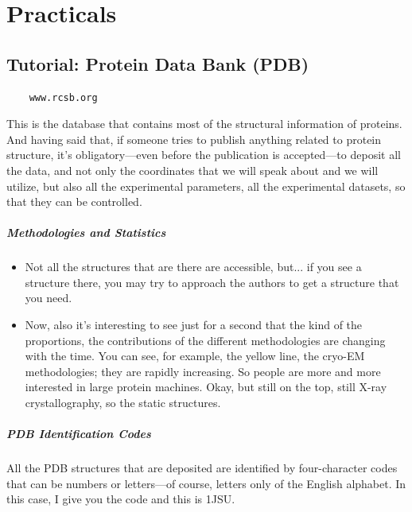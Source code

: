 \chapter{Practicals}
\section{Tutorial: Protein Data Bank (PDB)}
\begin{verbatim}
    www.rcsb.org
\end{verbatim}
\noindent This is the database that contains most of the structural information of proteins. And having said that, if someone tries to publish anything related to protein structure, it's obligatory—even before the publication is accepted—to deposit all the data, and not only the coordinates that we will speak about and we will utilize, but also all the experimental parameters, all the experimental datasets, so that they can be controlled.

\paragraph{Methodologies and Statistics}
\begin{itemize}
    \item Not all the structures that are there are accessible, but... if you see a structure there, you may try to approach the authors to get a structure that you need. 
    \item Now, also it's interesting to see just for a second that the kind of the proportions, the contributions of the different methodologies are changing with the time. You can see, for example, the yellow line, the cryo-EM methodologies; they are rapidly increasing. So people are more and more interested in large protein machines. Okay, but still on the top, still X-ray crystallography, so the static structures.
\end{itemize}

\paragraph{PDB Identification Codes}
All the PDB structures that are deposited are identified by four-character codes that can be numbers or letters—of course, letters only of the English alphabet. In this case, I give you the code and this is 1JSU.

